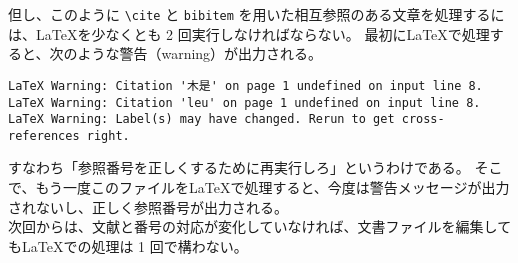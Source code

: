 但し、このように \verb'\cite' と \verb'bibitem' を用いた相互参照のある文章を処理するには、\LaTeX{}を少なくとも 2 回実行しなければならない。
最初に\LaTeX{}で処理すると、次のような警告（warning）が出力される。
\begin{mdframed}[roundcorner=0.50zw,leftmargin=3.00zw,rightmargin=3.00zw,skipabove=0.40zw,skipbelow=0.40zw,innertopmargin=4.00pt,innerbottommargin=4.00pt,innerleftmargin=5.00pt,innerrightmargin=5.00pt,linecolor=gray!090,linewidth=0.50pt,backgroundcolor=gray!90]\color{gray!10}
\begin{verbatim}
LaTeX Warning: Citation '木是' on page 1 undefined on input line 8.
LaTeX Warning: Citation 'leu' on page 1 undefined on input line 8.
LaTeX Warning: Label(s) may have changed. Rerun to get cross-references right.
\end{verbatim}
\end{mdframed}
すなわち「参照番号を正しくするために再実行しろ」というわけである。
そこで、もう一度このファイルを\LaTeX{}で処理すると、今度は警告メッセージが出力されないし、正しく参照番号が出力される。\\

次回からは、文献と番号の対応が変化していなければ、文書ファイルを編集しても\LaTeX{}での処理は 1 回で構わない。\\

